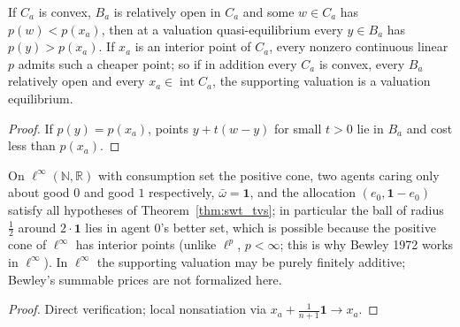 \begin{theorem}
\label{thm:swt_tvs_cheaper}
\leanok
{}
If $C_a$ is convex, $B_a$ is relatively open in $C_a$ and some $w \in C_a$ has $p(w) < p(x_a)$, then at a valuation
quasi-equilibrium every $y \in B_a$ has $p(y) > p(x_a)$. If $x_a$ is an interior point of $C_a$, every nonzero
continuous linear $p$ admits such a cheaper point; so if in addition every $C_a$ is convex, every $B_a$ relatively open
and every $x_a \in \operatorname{int} C_a$, the supporting valuation is a valuation equilibrium.
\end{theorem}
\begin{proof}
\leanok
If $p(y) = p(x_a)$, points $y + t(w - y)$ for small $t > 0$ lie in $B_a$ and cost less than $p(x_a)$.
\end{proof}

\begin{theorem}
\label{thm:linfty_economy}
\leanok
{}
On $\ell^\infty(\mathbb{N}, \mathbb{R})$ with consumption set the positive cone, two agents caring only about good
$0$ and good $1$ respectively, $\bar\omega = \mathbf{1}$, and the allocation $(e_0, \mathbf{1} - e_0)$ satisfy all
hypotheses of Theorem~\ref{thm:swt_tvs}; in particular the ball of radius $\tfrac12$ around $2 \cdot \mathbf{1}$ lies in
agent $0$'s better set, which is possible because the positive cone of $\ell^\infty$ has interior points (unlike
$\ell^p$, $p < \infty$; this is why Bewley 1972 works in $\ell^\infty$). In $\ell^\infty$ the supporting valuation may be
purely finitely additive; Bewley's summable prices are not formalized here.
\end{theorem}
\begin{proof}
\leanok
Direct verification; local nonsatiation via $x_a + \tfrac{1}{n+1}\mathbf{1} \to x_a$.
\end{proof}

